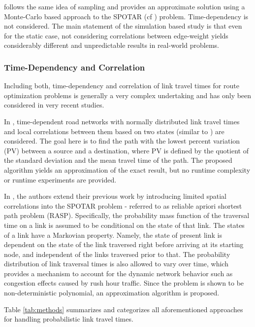 \cite{ZocNieWuMah13} follows the same idea of sampling and provides an
approximate solution using a Monte-Carlo based approach to the SPOTAR (cf
\cite{NieWu09}) problem. Time-dependency is not considered. The main
statement of the simulation based study is that even for the static case, not
considering correlations between edge-weight yields considerably different and unpredictable
results in real-world problems.

\subsubsection{Time-Dependency and Correlation}
Including both, time-dependency and correlation of link travel times for route
optimization problems is generally a very complex undertaking and has only been
considered in very recent studies.

In \cite{DonLiVoVu12}, time-dependent road networks with normally distributed
link travel times and local correlations between them based on two states
(similar to \cite{NieFan06}) are considered. The goal here is to find the path
with the lowest percent variation (PV) between a source and a destination, where
PV is defined by the quotient of the standard deviation and the mean travel time of
the path. The proposed algorithm yields an approximation of the exact result,
but no runtime complexity or runtime experiments are provided.

In \cite{NieWu09a}, the authors extend their previous work \cite{NieWu09} by
introducing limited spatial correlations into the SPOTAR problem - referred to
as reliable apriori shortest path problem (RASP). Specifically, the probability mass function of the traversal time on a link is assumed to be
conditional on the state of that link. The states of a link have a Markovian
property. Namely, the state of present link is dependent on the state of the
link traversed right before arriving at its starting node, and independent of
the links traversed prior to that. The probability distribution of link
traversal times is also allowed to vary over time, which provides a mechanism to
account for the dynamic network behavior such as congestion effects caused by
rush hour traffic. Since the problem is shown to be non-deterministic
polynomial, an approximation algorithm is proposed.

Table \ref{tab:methods} summarizes and categorizes all aforementioned approaches
for handling probabilistic link travel times.

